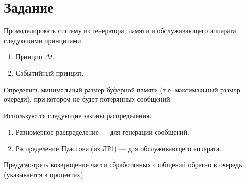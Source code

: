 \chapter{Задание}

Промоделировать систему из генератора, памяти и обслуживающего аппарата следующими принципами.
 \begin{enumerate}
 	\item Принцип $ \Delta t $.
 	\item Событийный принцип.
 \end{enumerate}

Определить минимальный размер буферной памяти (т.е. максимальный размер очереди), при котором не будет потерянных сообщений.

Используются следующие законы распределения.
\begin{enumerate}
    \item Равномерное распределение --- для генерации сообщений.
    \item Распределение Пуассона (из ЛР1) --- для обслуживающего аппарата.
\end{enumerate}

Предусмотреть возвращение части обработанных сообщений обратно в очередь (указывается в процентах).
